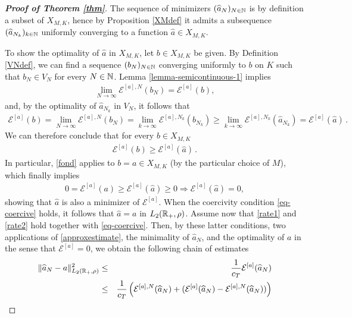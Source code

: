 \begin{proof}[\normalfont\bf Proof of Theorem \ref{thm}]

	The sequence of minimizers $(\widehat a_N)_{N \in \mathbb{N}}$ is by definition a subset of $X_{M,K}$, hence by Proposition \ref{XMdef} it admits a subsequence $(\widehat a_{N_k})_{k \in \mathbb{N}}$ uniformly converging to a function $\widehat a \in X_{M,K}$.
	
	To show the optimality of $\widehat a$ in $X_{M,K}$, let $b\in X_{M,K}$ be given. By Definition \ref{VNdef}, we can find a sequence $(b_N)_{N \in \mathbb{N}}$ converging uniformly to $b$ on $K$ such that $b_N\in V_N$ for every $N\in \mathbb{N}$. Lemma \ref{lemma-semicontinuous-1} implies
	\begin{align*}
		\lim_{N\rightarrow\infty} \mathcal E^{[a],N}(b_{N})= \mathcal E^{[a]}(b),
	\end{align*}	
	and, by the optimality of $\widehat a_{N_k}$ in $V_N$, it follows that
	\begin{align*}
		\mathcal E^{[a]} (b)=\lim_{N\rightarrow\infty}\mathcal E^{[a],N}(b_N)
			= \lim_{k \rightarrow\infty}\mathcal E^{[a],N_k}(b_{N_k})
			\geq\lim_{k \rightarrow\infty}\mathcal E^{[a],N_k}(\widehat a_{N_k})
			= \mathcal E^{[a]} (\widehat a)\,.
	\end{align*}
	We can therefore conclude that for every $b \in X_{M,K}$
	\begin{align}\label{fond}
		 \mathcal E^{[a]} (b)\geq \mathcal E^{[a]} (\widehat a)\,.
	\end{align}
 In particular, \eqref{fond} applies to $b=a\in X_{M,K}$ (by the particular choice of $M$), which finally implies
	\begin{align*}
		0=\mathcal E^{[a]} (a)\geq \mathcal E^{[a]} (\widehat a)\geq 0\Longrightarrow \mathcal E^{[a]} (\widehat a)=0,
	\end{align*}
	showing that $\widehat a$ is also a minimizer of $\mathcal E^{[a]}$. When the coercivity condition \eqref{eq-coercive} holds,  it follows that $\widehat a=a$ in $L_2(\mathbb{R}_+,\rho)$.
Assume now that \eqref{rate1} and \eqref{rate2} hold together with  \eqref{eq-coercive}. Then, by these latter conditions, two applications of \eqref{approxestimate}, the minimality of $\widehat a_N$, and the optimality of
$a$ in the sense that $\mathcal E^{[a]}=0$, we obtain the following chain of estimates
\begin{eqnarray*}
\| \widehat a_N - a \|_{L_2(\R_+,\rho)}^2 &\leq& \frac{1}{c_T}  \mathcal E^{[a]}(\widehat a_N) \\
&\leq& \frac{1}{c_T} \left ( \mathcal E^{[a],N}(\widehat a_N) + ( \mathcal E^{[a]}(\widehat a_N)- \mathcal E^{[a],N}(\widehat a_N))  \right )\\

\end{eqnarray*}
\end{proof}

